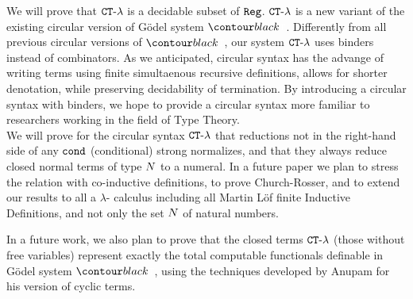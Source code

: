 We will prove that ${ {\tt CT}\mbox{-}\lambda}$ is a decidable subset of ${\tt Reg}$.
${ {\tt CT}\mbox{-}\lambda}$ is a new variant of the existing circular version of 
G\"{o}del system $\systemT$. Differently from all previous circular versions of 
$\systemT$, our system ${ {\tt CT}\mbox{-}\lambda}$ uses binders instead of combinators. 
As we anticipated, circular syntax has the advange of writing terms using
finite simultaenous recursive definitions, allows for shorter denotation, while preserving decidability of termination. By introducing a circular syntax with binders, 
we hope to provide a circular syntax more familiar to researchers working in the
field of Type Theory.
\\

We will prove for the circular syntax ${ {\tt CT}\mbox{-}\lambda}$
that reductions not in the right-hand side of any ${\tt cond}$ (conditional)
strong normalizes, and that they always reduce closed normal terms of type ${N}$ to a numeral. In a future paper we plan to stress the relation with co-inductive definitions, to prove Church-Rosser, and to extend our results to all a $\lambda$-
calculus including all Martin L\"{o}f finite Inductive Definitions, and not only
the set ${N}$ of natural numbers.


In a future work, we also plan to prove that the closed terms ${ {\tt CT}\mbox{-}\lambda}$ 
(those without free variables) represent exactly the total computable functionals 
definable in G\"{o}del system $\systemT$, using the techniques developed by 
Anupam for his version of cyclic terms.



